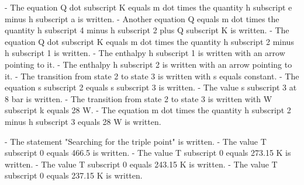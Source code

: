 - The equation Q dot subscript K equals m dot times the quantity h subscript e minus h subscript a is written.
- Another equation Q equals m dot times the quantity h subscript 4 minus h subscript 2 plus Q subscript K is written.
- The equation Q dot subscript K equals m dot times the quantity h subscript 2 minus h subscript 1 is written.
- The enthalpy h subscript 1 is written with an arrow pointing to it.
- The enthalpy h subscript 2 is written with an arrow pointing to it.
- The transition from state 2 to state 3 is written with s equals constant.
- The equation s subscript 2 equals s subscript 3 is written.
- The value s subscript 3 at 8 bar is written.
- The transition from state 2 to state 3 is written with W subscript k equals 28 W.
- The equation m dot times the quantity h subscript 2 minus h subscript 3 equals 28 W is written.

- The statement "Searching for the triple point" is written.
- The value T subscript 0 equals 466.5 is written.
- The value T subscript 0 equals 273.15 K is written.
- The value T subscript 0 equals 243.15 K is written.
- The value T subscript 0 equals 237.15 K is written.